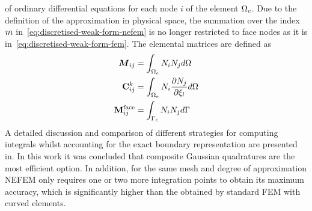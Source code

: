of ordinary differential equations for each node $i$ of the element $\Omega_e$. Due to the definition of the approximation in physical space, the summation over the index $m$ in~\eqref{eq:discretised-weak-form-nefem} is no longer restricted to face nodes as it is in~\eqref{eq:discretised-weak-form-fem}. The elemental matrices are defined as
\begin{align*}
\boldsymbol{M}_{ij} &= \int_{\Omega_e} N_i N_j d\Omega \\
\mathbf{C}^{k}_{ij} &= 
               \int_{\Omega_e}
               N_i
               \frac{\partial N_j}{\partial \xi_{l}}
               d\Omega \\
\mathbf{M}^{\textrm{face}}_{ij} &= \int_{\Gamma_e} N_i N_j d\Gamma
\end{align*}
A detailed discussion and comparison of different strategies for computing integrals whilst accounting for the exact boundary representation are presented in\cite{NEFEM-Integration}. In this work it was concluded that composite Gaussian quadratures are the most efficient option. In addition, for the same mesh and degree of approximation NEFEM only requires one or two more integration points to obtain its maximum accuracy, which is significantly higher than the obtained by standard FEM with curved elements. 



